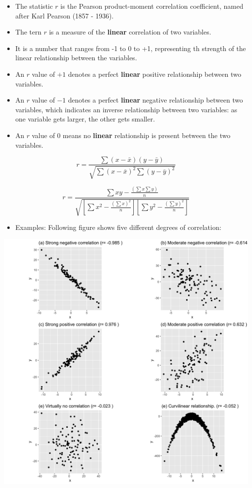 \documentclass[]{book}
\providecommand{\tightlist}{%
  \setlength{\itemsep}{0pt}\setlength{\parskip}{0pt}}
\begin{document}
\begin{itemize}
\tightlist
\item
  The statistic \(r\) is the Pearson product-moment correlation coefficient, named after Karl Pearson (1857 - 1936).
\item
  The tern \(r\) is a measure of the \textbf{linear} correlation of two variables.
\item
  It is a number that ranges from -1 to 0 to +1, representing th strength of the linear relationship between the variables.
\item
  An \(r\) value of \(+1\) denotes a perfect \textbf{linear} positive relationship between two variables.
\item
  An \(r\) value of \(-1\) denotes a perfect \textbf{linear} negative relationship between two variables, which indicates an inverse relationship between two variables: as one variable gets larger, the other gets smaller.
\item
  An \(r\) value of 0 means no \textbf{linear} relationship is present between the two variables.
\end{itemize}

\[ r = \frac{\sum(x-\bar{x})(y-\bar{y})}{\sqrt{\sum(x-\bar{x})^2\sum(y-\bar{y})^2}}\]

\[ r = \frac{\sum{xy} - \frac{(\sum x\sum y)}{n}}{\sqrt{[\sum{x^2- \frac{(\sum{x})^2}{n}}][\sum y^2-\frac{(\sum y)^2}{n}]}}\]

\begin{itemize}
\tightlist
\item
  Examples: Following figure shows five different degrees of correlation:
\end{itemize}

\begin{center}\includegraphics[width=1\linewidth]{figure/cor-1} \end{center}
\end{document}
